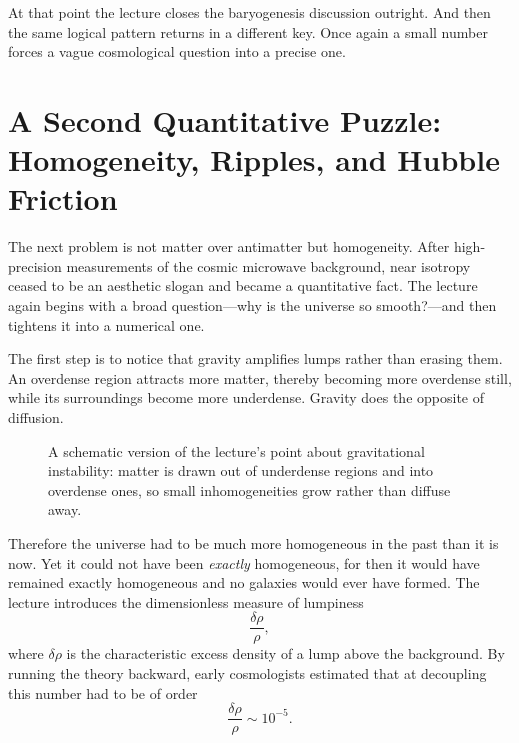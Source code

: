 At that point the lecture closes the baryogenesis discussion outright. And then the same logical pattern returns in a different key. Once again a small number forces a vague cosmological question into a precise one.

\section{A Second Quantitative Puzzle: Homogeneity, Ripples, and Hubble Friction}

The next problem is not matter over antimatter but homogeneity.
After high-precision measurements of the cosmic microwave background, near isotropy ceased to be an aesthetic slogan and became a quantitative fact.
The lecture again begins with a broad question---why is the universe so smooth?---and then tightens it into a numerical one.

The first step is to notice that gravity amplifies lumps rather than erasing them. An overdense region attracts more matter, thereby becoming more overdense still, while its surroundings become more underdense. Gravity does the opposite of diffusion.

\begin{figure}
\centering
{}%
\caption{A schematic version of the lecture's point about gravitational instability: matter is drawn out of underdense regions and into overdense ones, so small inhomogeneities grow rather than diffuse away.}
\end{figure}

Therefore the universe had to be much more homogeneous in the past than it is now. Yet it could not have been \emph{exactly} homogeneous, for then it would have remained exactly homogeneous and no galaxies would ever have formed. The lecture introduces the dimensionless measure of lumpiness
\begin{equation}
\frac{\delta \rho}{\rho},
\end{equation}
where \(\delta\rho\) is the characteristic excess density of a lump above the background. By running the theory backward, early cosmologists estimated that at decoupling this number had to be of order
\begin{equation}
\frac{\delta \rho}{\rho}\sim 10^{-5}.
\end{equation}

